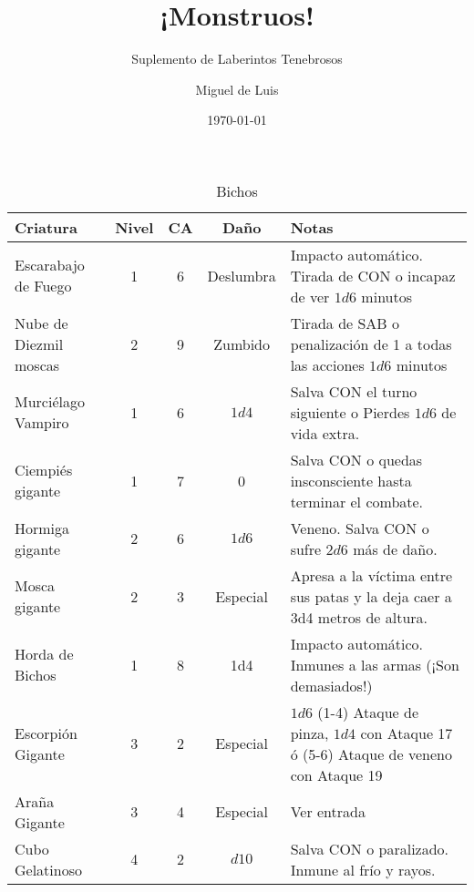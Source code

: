 



\title{¡Monstruos!}
\subtitle{Suplemento de Laberintos Tenebrosos}
\author{Miguel de Luis}
\date{\today}
\maketitle

\begin{table*}[p]
\caption{Bichos}
\label{c:monstruos}
\centering
\begin{threeparttable}
\begin{tabular}{lcccp{8cm}}
\toprule
Criatura             & Nivel &   CA & Daño & Notas\\
\midrule
Escarabajo de Fuego  &  1 & 6 & Deslumbra &  Impacto automático. Tirada de CON o incapaz de ver $ 1d6$ minutos\\
Nube de Diezmil moscas& 2 & 9 & Zumbido & Tirada de SAB o penalización de 1 a todas las acciones $1d6$ minutos\\
Murciélago Vampiro   & 1 & 6 & $ 1d4$ & Salva CON el turno siguiente o Pierdes $ 1d6$ de vida extra.\\
Ciempiés gigante     & 1 & 7 & 0 & Salva CON o quedas insconsciente hasta terminar el combate.\\
\midrule
Hormiga gigante      & 2 & 6 & $ 1d6$ & Veneno. Salva CON o sufre $ 2d6$ más de daño.\\
Mosca gigante        & 2 & 3 & Especial & Apresa a la víctima entre sus patas y la deja caer a 3d4 metros de altura.\\
Horda de Bichos      &  1 &  8  & 1d4 & Impacto automático. Inmunes a las armas (¡Son demasiados!)\\
\midrule
Escorpión Gigante    & 3 & 2 & Especial & $1d6$ (1-4) Ataque de pinza, $1d4$ con Ataque 17 ó (5-6) Ataque de veneno con Ataque 19\\
Araña Gigante        & 3 & 4 & Especial & Ver entrada\\
\midrule
Cubo Gelatinoso      & 4 & 2 &$  d10$ & Salva CON o paralizado. Inmune al frío y rayos.\\

\midrule

\bottomrule
\end{tabular}

\end{threeparttable}
\end{table*}


